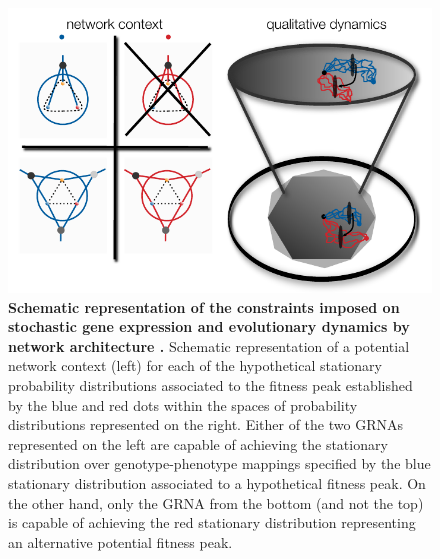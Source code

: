 \begin{figure}[!ht]
\centering
\noindent\includegraphics[width=0.9\columnwidth]{fig/stochdynscheme.pdf}
\caption{{\bf Schematic representation of the constraints imposed on stochastic gene expression and evolutionary dynamics by network architecture .} Schematic representation of a potential network context (left) for each of the hypothetical stationary probability distributions associated to the fitness peak established by the blue and red dots within the spaces of probability distributions represented on the right. Either of the two GRNAs represented on the left are capable of achieving the stationary distribution over genotype-phenotype mappings specified by the blue stationary distribution associated to a hypothetical fitness peak. On the other hand, only the GRNA from the bottom (and not the top) is capable of achieving the red stationary distribution representing an alternative potential fitness peak.}
\label{fig:stochdynscheme}
\end{figure}
